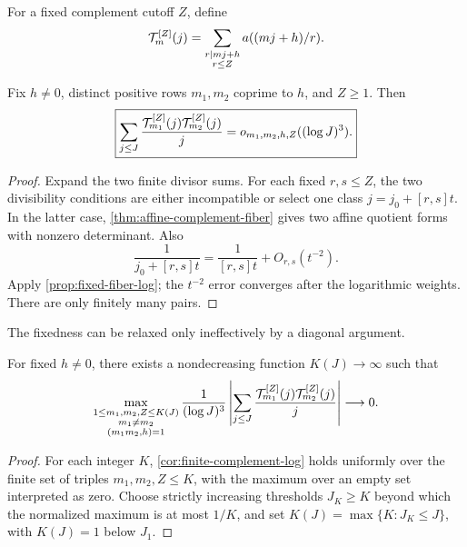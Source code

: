 For a fixed complement cutoff \(Z\), define
\begin{equation}
 \mathcal T_{m}^{[Z]}(j)
 =\sum_{\substack{r\mid mj+h\\r\le Z}}a((mj+h)/r).
 \label{eq:fixed-complement-truncation}
\end{equation}

\begin{corollary}
\label{cor:finite-complement-log}
Fix \(h\ne0\), distinct positive rows \(m_1,m_2\) coprime to \(h\),
and \(Z\ge1\).  Then
\begin{equation}
 \boxed{
 \sum_{j\le J}\frac{
  \mathcal T_{m_1}^{[Z]}(j)\mathcal T_{m_2}^{[Z]}(j)}j
 =o_{m_1,m_2,h,Z}((\log J)^3).}
 \label{eq:finite-complement-log}
\end{equation}
\end{corollary}

\begin{proof}
Expand the two finite divisor sums.  For each fixed \(r,s\le Z\), the
two divisibility conditions are either incompatible or select one
class \(j=j_0+[r,s]t\).  In the latter case,
\cref{thm:affine-complement-fiber} gives two affine quotient forms with
nonzero determinant.  Also
\[
 \frac1{j_0+[r,s]t}
 =\frac1{[r,s]t}+O_{r,s}(t^{-2}).
\]
Apply \cref{prop:fixed-fiber-log}; the \(t^{-2}\) error converges after
the logarithmic weights.  There are only finitely many pairs.
\end{proof}

The fixedness can be relaxed only ineffectively by a diagonal argument.

\begin{corollary}
\label{cor:slow-window}
For fixed \(h\ne0\), there exists a nondecreasing function
\(K(J)\to\infty\) such that
\begin{equation}
 \max_{\substack{1\le m_1,m_2,Z\le K(J)\\m_1\ne m_2\\
                  (m_1m_2,h)=1}}
 \frac1{(\log J)^3}
 \left|\sum_{j\le J}\frac{
 \mathcal T_{m_1}^{[Z]}(j)\mathcal T_{m_2}^{[Z]}(j)}j\right|
 \longrightarrow0.
 \label{eq:slow-window}
\end{equation}
\end{corollary}

\begin{proof}
For each integer \(K\), \cref{cor:finite-complement-log} holds
uniformly over the finite set of triples \(m_1,m_2,Z\le K\), with the
maximum over an empty set interpreted as zero.  Choose
strictly increasing thresholds \(J_K\ge K\) beyond which the normalized
maximum is at most \(1/K\), and set
\(K(J)=\max\{K:J_K\le J\}\), with \(K(J)=1\) below \(J_1\).
\end{proof}

